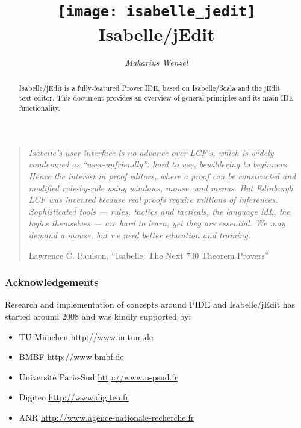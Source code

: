 \documentclass[12pt,a4paper]{report}
\title{\texttt{[image: isabelle\_jedit]} \\[4ex] Isabelle/jEdit}
\author{\emph{Makarius Wenzel}}
\begin{document}
\maketitle

\begin{abstract}
  Isabelle/jEdit is a fully-featured Prover IDE, based on Isabelle/Scala and
  the jEdit text editor. This document provides an overview of general
  principles and its main IDE functionality.
\end{abstract}

\vspace*{2.5cm}

\begin{quote}
  {\small\em Isabelle's user interface is no advance over LCF's, which is
  widely condemned as ``user-unfriendly'': hard to use, bewildering to
  beginners. Hence the interest in proof editors, where a proof can be
  constructed and modified rule-by-rule using windows, mouse, and menus. But
  Edinburgh LCF was invented because real proofs require millions of
  inferences. Sophisticated tools --- rules, tactics and tacticals, the
  language ML, the logics themselves --- are hard to learn, yet they are
  essential. We may demand a mouse, but we need better education and
  training.}

  Lawrence C. Paulson, ``Isabelle: The Next 700 Theorem Provers''
\end{quote}


\vspace*{2.5cm}


\subsubsection*{Acknowledgements}

Research and implementation of concepts around PIDE and Isabelle/jEdit has
started around 2008 and was kindly supported by:
\begin{itemize}
\item TU M\"unchen \url{http://www.in.tum.de}
\item BMBF \url{http://www.bmbf.de}
\item Universit\'e Paris-Sud \url{http://www.u-psud.fr}
\item Digiteo \url{http://www.digiteo.fr}
\item ANR \url{http://www.agence-nationale-recherche.fr}
\end{itemize}


 \tableofcontents \clearfirst



\begingroup
  \tocentry{\bibname}
   \small\raggedright\frenchspacing
  
\endgroup

\tocentry{\indexname}
\printindex
\end{document}
